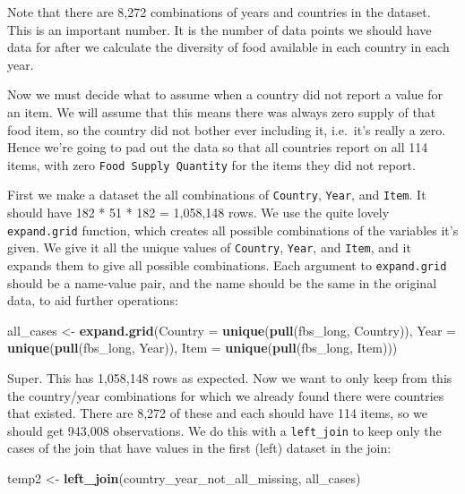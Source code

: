 \documentclass[]{book}
\newenvironment{Shaded}{\begin{snugshade}}{\end{snugshade}}
\newcommand{\DataTypeTok}[1]{\textcolor[rgb]{0.13,0.29,0.53}{#1}}
\newcommand{\KeywordTok}[1]{\textcolor[rgb]{0.13,0.29,0.53}{\textbf{#1}}}
\newcommand{\NormalTok}[1]{#1}
\newcommand{\StringTok}[1]{\textcolor[rgb]{0.31,0.60,0.02}{#1}}
\begin{document}
Note that there are 8,272 combinations of years and countries in the dataset. This is an important number. It is the number of data points we should have data for after we calculate the diversity of food available in each country in each year.

Now we must decide what to assume when a country did not report a value for an item. We will assume that this means there was always zero supply of that food item, so the country did not bother ever including it, i.e.~it's really a zero. Hence we're going to pad out the data so that all countries report on all 114 items, with zero \texttt{Food\ Supply\ Quantity} for the items they did not report.

First we make a dataset the all combinations of \texttt{Country}, \texttt{Year}, and \texttt{Item}. It should have 182 * 51 * 182 = 1,058,148 rows. We use the quite lovely \texttt{expand.grid} function, which creates all possible combinations of the variables it's given. We give it all the unique values of \texttt{Country}, \texttt{Year}, and \texttt{Item}, and it expands them to give all possible combinations. Each argument to \texttt{expand.grid} should be a name-value pair, and the name should be the same in the original data, to aid further operations:

\begin{Shaded}
\begin{Highlighting}[]
\NormalTok{all_cases <-}\StringTok{ }\KeywordTok{expand.grid}\NormalTok{(}\DataTypeTok{Country =} \KeywordTok{unique}\NormalTok{(}\KeywordTok{pull}\NormalTok{(fbs_long, Country)),}
                         \DataTypeTok{Year =} \KeywordTok{unique}\NormalTok{(}\KeywordTok{pull}\NormalTok{(fbs_long, Year)),}
                         \DataTypeTok{Item =} \KeywordTok{unique}\NormalTok{(}\KeywordTok{pull}\NormalTok{(fbs_long, Item))) }
\end{Highlighting}
\end{Shaded}

Super. This has 1,058,148 rows as expected. Now we want to only keep from this the country/year combinations for which we already found there were countries that existed. There are 8,272 of these and each should have 114 items, so we should get 943,008 observations. We do this with a \texttt{left\_join} to keep only the cases of the join that have values in the first (left) dataset in the join:

\begin{Shaded}
\begin{Highlighting}[]
\NormalTok{temp2 <-}\StringTok{ }\KeywordTok{left_join}\NormalTok{(country_year_not_all_missing, all_cases)}
\end{Highlighting}
\end{Shaded}
\end{document}
